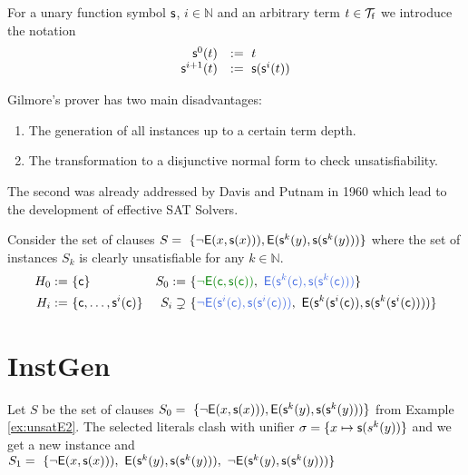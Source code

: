 \begin{definition}
	For a unary function symbol ${\mathsf s}$,
	$i\in\mathbb{N}$ and an arbitrary term $t\in{\mathcal T}_{\mathsf f}$ we introduce the notation
	\[
\begin{array}{rl}
{\mathsf s}^0(t) &:=\ t \\
{\mathsf s}^{i+1}(t) &:=\ {\mathsf s}({\mathsf s}^i(t))
\end{array}
	\]
\end{definition}



Gilmore's prover has two main disadvantages:
\begin{enumerate}
	\item The generation of all instances up to a certain term depth.
	\item The transformation to a disjunctive normal form to check unsatisfiability.
\end{enumerate}

The second was already addressed by Davis and Putnam in 1960
which lead to the development of effective SAT Solvers.

\begin{example}\label{ex:unsatE2}
	Consider the set of clauses 
	$S =\
	\{
	{ \lnot{\mathsf{E}}(x, {\mathsf s}(x)))}, 
	{ {\mathsf{E}}({\mathsf s}^k(y), {\mathsf s}({\mathsf s}^k(y)))}
	\}$ 
	where the set of instances $S_k$ is clearly unsatisfiable for any $k\in\mathbb{N}$.
%	
\begin{align*}
H_{0} :=&\  \{ \mc \} 
&
S_{0} :=&\ \{ 
{\colHi\lnot\mE(\mc,\msucc(\mc))},\
{\colEm \mE(\ms^k(\mc), \ms(\ms^k(\mc)))}
\}
\\
H_{i} :=&\ \{ \mc, \ldots, \msucc^i(\mc) \} 
&
S_{i} \supsetneq&\
\{
{\colEm \lnot\mE(\msucc^i(\mc),\msucc(\msucc^i(\mc)))},\
{\mE(\ms^k(\msucc^i(\mc)), \ms(\ms^k(\msucc^i(\mc))))}
\}
\end{align*}
\end{example}

\section{InstGen}

\begin{example}\label{ex:unsat2}
Let $S$ be the set of clauses 
$S_0 =\
\{
{ \lnot{\mathsf{E}}(x, {\mathsf s}(x)))}, 
{ {\mathsf{E}}({\mathsf s}^k(y), {\mathsf s}({\mathsf s}^k(y)))}
\}$
 from Example \ref{ex:unsatE2}. 
 The selected literals clash with unifier 
 $\sigma = \{ x\mapsto {\mathsf s}(s^k(y)) \}$ and we get a new instance
and $S_1 =\
 \{
 { \lnot{\mathsf{E}}(x, {\mathsf s}(x)))},\  
 { {\mathsf{E}}({\mathsf s}^k(y), {\mathsf s}({\mathsf s}^k(y)))},\
 { \lnot{\mathsf{E}}({\mathsf s}^k(y), {\mathsf s}({\mathsf s}^k(y)))}
 \}$
\end{example}




